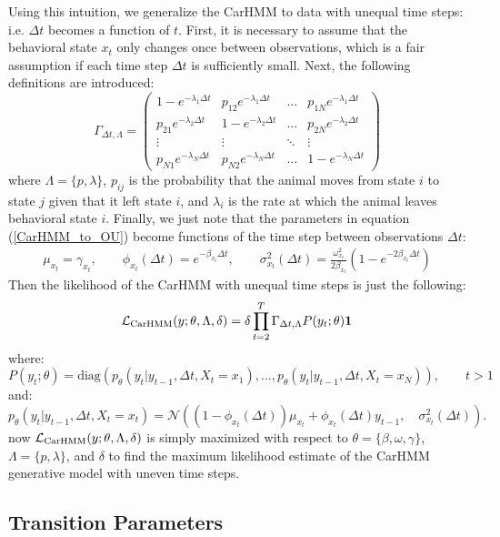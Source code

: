 Using this intuition, we generalize the CarHMM to data with unequal time steps: i.e. $\Delta t$ becomes a function of $t$. First, it is necessary to assume that the behavioral state $x_t$ only changes once between observations, which is a fair assumption if each time step $\Delta t$ is sufficiently small. Next, the following definitions are introduced:
%
$$\Gamma_{\Delta t,\Lambda} = \begin{pmatrix} 
1-e^{-\lambda_1 \Delta t} & p_{12} e^{-\lambda_1 \Delta t} & \dots & p_{1N} e^{-\lambda_1 \Delta t} \\
p_{21} e^{-\lambda_2 \Delta t} & 1-e^{-\lambda_2 \Delta t} & \dots & p_{2N} e^{-\lambda_2 \Delta t} \\
\vdots & \vdots & \ddots & \vdots \\
p_{N1} e^{-\lambda_N \Delta t} & p_{N2} e^{-\lambda_N \Delta t} & \dots  & 1-e^{-\lambda_N \Delta t}
\end{pmatrix}$$
%
where $\Lambda = \{p,\lambda\}$, $p_{ij}$ is the probability that the animal moves from state $i$ to state $j$ given that it left state $i$, and $\lambda_i$ is the rate at which the animal leaves behavioral state $i$. Finally, we just note that the parameters in equation (\ref{CarHMM_to_OU}) become functions of the time step between observations $\Delta t$:
%
\begin{align*}
\mu_{x_t}= \gamma_{x_t}, \qquad \phi_{x_t}(\Delta t) = e^{-\beta_{x_t}\Delta t}, \qquad \sigma^2_{x_t}(\Delta t) = \frac{\omega_{x_t}^2}{2\beta_{x_t}} (1-e^{-2\beta_{x_t}\Delta t})
\end{align*}
%
Then the likelihood of the CarHMM with unequal time steps is just the following:
%
$$\mathcal{L}_{\text{CarHMM}}(y;\theta,\Lambda,\delta) = \delta \prod_{t=2}^{T} \Gamma_{\Delta t,\Lambda} P(y_t;\theta) \mathbf{1}$$
%
where:
%
$$P(y_t;\theta) = \text{diag}(p_\theta(y_t|y_{t-1}, \Delta t, X_t = x_1), . . . , p_\theta(y_t|y_{t-1}, \Delta t, X_t = x_N )), \qquad t > 1$$
%
and:
%
$$p_\theta(y_t|y_{t-1}, \Delta t, X_t = x_t) = \mathcal{N}\left((1-\phi_{x_t}(\Delta t))\mu_{x_t} + \phi_{x_t}(\Delta t) y_{t-1},\quad \sigma_{x_t}^2(\Delta t) \right).$$
%
now $\mathcal{L}_{\text{CarHMM}}(y;\theta,\Lambda,\delta)$ is simply maximized with respect to $\theta = \{\beta,\omega,\gamma\}$, $\Lambda = \{p,\lambda\}$, and $\delta$ to find the maximum likelihood estimate of the CarHMM generative model with uneven time steps.

\iffalse

\subsection{Transition Parameters}

